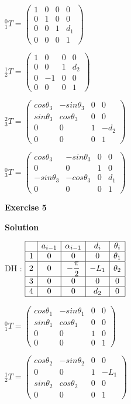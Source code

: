 \documentclass[8pt]{article}
\begin{document}
\begin{list}{()~}{}
$^0_1T = \left( \begin{array}{cccc}
1&0&0&0\\
0&1&0&0\\
0 & 0 & 1 & d_1\\
0&0&0&1
\end{array} \right) $

$^1_2T = \left( \begin{array}{cccc}
1&0&0&0\\
0&0&1&d_2\\
0& -1 & 0 & 0\\
0&0&0&1
\end{array} \right) $

$^2_3T = \left( \begin{array}{cccc}
cos\theta_3& -sin\theta_3 &0&0\\
sin\theta_3&cos\theta_3&0&0\\
0 & 0 & 1 & -d_2\\
0&0&0&1
\end{array} \right) $

$^0_3T = \left( \begin{array}{cccc}
cos\theta_3 & -sin\theta_3 &0&0\\
0&0&1&0\\
-sin\theta_3  & -cos\theta_3 & 0 & d_1\\
0&0&0&1
\end{array} \right) $

\textbf{Exercise 5}		
		
\textbf{Solution}

DH :
$ \begin{array}{|c|c|c|c|c|}
\hline
& a_{i-1} & \alpha_{i-1} & d_i & \theta_i \\
\hline
1 & 0 & 0 & 0 & \theta_1 \\
\hline
2 & 0 & -\dfrac{\pi}{2} & -L_1 & \theta_2 \\
\hline
3 & 0 & 0 & 0 & 0\\
\hline
4 & 0 & 0 & d_2 & 0\\
\hline
\end{array} $


$^0_1T = \left( \begin{array}{cccc}
cos\theta_1&-sin\theta_1&0&0\\
sin\theta_1&cos\theta_1&0&0\\
0 & 0 & 1 & 0\\
0&0&0&1
\end{array} \right) $

$^1_2T = \left( \begin{array}{cccc}
cos\theta_2&-sin\theta_2&0&0\\
0&0&1&-L_1\\
sin\theta_2 & cos\theta_2 & 0 & 0\\
0&0&0&1
\end{array} \right) $


\end{list}
\end{document}
